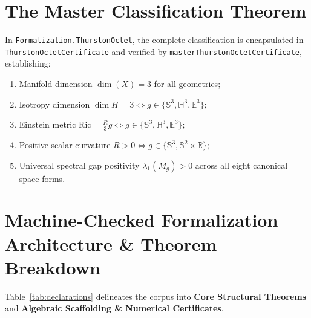 \documentclass[11pt,a4paper]{article}
\begin{document}
\section{The Master Classification Theorem}
In \texttt{Formalization.ThurstonOctet}, the complete classification is encapsulated in \texttt{ThurstonOctetCertificate} and verified by \texttt{masterThurstonOctetCertificate}, establishing:
\begin{enumerate}
\item Manifold dimension $\dim(X) = 3$ for all geometries;
\item Isotropy dimension $\dim H = 3 \iff g \in \{\mathbb{S}^3, \mathbb{H}^3, \mathbb{E}^3\}$;
\item Einstein metric $\mathrm{Ric} = \frac{R}{3}g \iff g \in \{\mathbb{S}^3, \mathbb{H}^3, \mathbb{E}^3\}$;
\item Positive scalar curvature $R > 0 \iff g \in \{\mathbb{S}^3, \mathbb{S}^2 \times \mathbb{R}\}$;
\item Universal spectral gap positivity $\lambda_1(M_g) > 0$ across all eight canonical space forms.
\end{enumerate}

\section{Machine-Checked Formalization Architecture \& Theorem Breakdown}
Table~\ref{tab:declarations} delineates the corpus into \textbf{Core Structural Theorems} and \textbf{Algebraic Scaffolding \& Numerical Certificates}.
\end{document}
